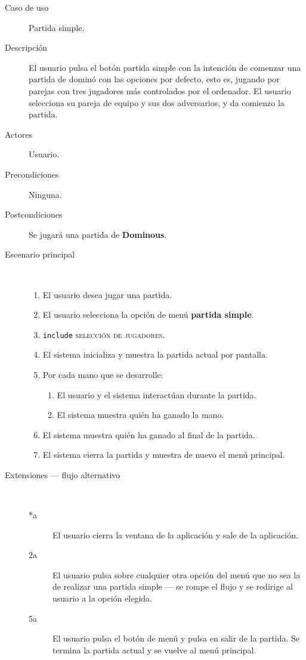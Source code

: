 \begin{description}
    \item[Caso de uso] Partida simple.
    \item[Descripción] El usuario pulsa el botón partida simple con la intención de comenzar una partida
            de dominó con las opciones por defecto, esto es, jugando por parejas con tres jugadores más
            controlados por el ordenador. El usuario selecciona su pareja de equipo y sus dos adversarios, y
            da comienzo la partida.
    \item[Actores] Usuario.
    \item[Precondiciones] Ninguna.
    \item[Postcondiciones] Se jugará una partida de \textbf{Dominous}.
    \item[Escenario principal] $\quad$
        \begin{enumerate}
            \item El usuario desea jugar una partida.
            \item El usuario selecciona la opción de menú \textbf{partida simple}.
            \item \texttt{include} \textsc{selección de jugadores}.
            \item El sistema inicializa y muestra la partida actual por pantalla.
            \item Por cada mano que se desarrolle:
                \begin{enumerate}
                    \item El usuario y el sistema interactúan durante la partida.
                    \item El sistema muestra quién ha ganado la mano.
                \end{enumerate}
            \item El sistema muestra quién ha ganado al final de la partida.
            \item El sistema cierra la partida y muestra de nuevo el menú principal.
        \end{enumerate}
    \item[Extensiones --- flujo alternativo] $\quad$
        \begin{description}
            \item[*a ] El usuario cierra la ventana de la aplicación y sale de la aplicación.
            \item[2a ] El usuario pulsa sobre cualquier otra opción del menú que no sea la de realizar una
                    partida simple --- se rompe el flujo y se redirige al usuario a la opción elegida. 
            \item[5a ] El usuario pulsa el botón de menú y pulsa en salir de la partida. Se termina la partida
                    actual y se vuelve al menú principal.
        \end{description}
\end{description}

